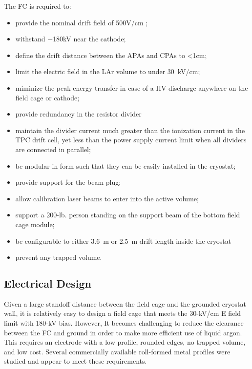 The FC is required to:
\begin{itemize}
\item provide the nominal drift field of 500V/cm ;
\item withstand $-$180kV near the cathode;
\item define the drift distance between the APAs and CPAs to <1cm;
\item limit the electric field %
in the LAr volume to under 30~kV/cm;
\item miminize the peak energy transfer in case of a HV discharge anywhere on the field cage or cathode;
\item provide redundancy in the resistor divider 
\item maintain the divider current %
much greater than the ionization current in the TPC drift cell, yet less than the power supply current limit when all dividers are connected in parallel;
\item %
be modular in form such that they can be easily installed in the cryostat;
\item provide support for the beam plug;
\item allow calibration laser beams to enter into the active volume; 
\item support a 200-lb. person standing on the support beam of the bottom field cage module;
\item be configurable to either 3.6~m or 2.5~m drift length inside the cryostat
\item %
prevent any trapped volume.

\end{itemize}

\subsection{Electrical Design}

Given a large standoff distance between the field cage and the grounded cryostat wall, it is relatively easy to design a field cage that meets the 30-kV/cm E field limit with 180-kV bias.  However, It becomes challenging %
to reduce the clearance between the FC and ground in order to make more efficient use of liquid argon.  %
This requires an electrode with a low profile, rounded edges, no trapped volume, and low cost.  Several commercially available roll-formed metal profiles were studied and appear to meet these requirements. 


